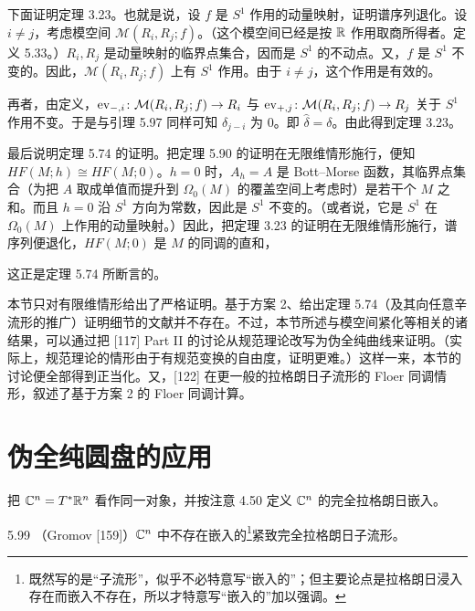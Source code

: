 下面证明定理 3.23。也就是说，设 $f$ 是 $S^1$ 作用的动量映射，证明谱序列退化。设 $i\neq j$，考虑模空间 $\mathcal{M}(R_i,R_j;f)$。（这个模空间已经是按 $\mathbb{R}$ 作用取商所得者。定义 5.33。）$R_i,R_j$ 是动量映射的临界点集合，因而是 $S^1$ 的不动点。又，$f$ 是 $S^1$ 不变的。因此，$\mathcal{M}(R_i,R_j;f)$ 上有 $S^1$ 作用。由于 $i\neq j$，这个作用是有效的。

再者，由定义，$\operatorname{ev}_{-,i}\colon\mathcal{M}(R_i,R_j;f)\to R_i$ 与 $\operatorname{ev}_{+,j}\colon\mathcal{M}(R_i,R_j;f)\to R_j$ 关于 $S^1$ 作用不变。于是与引理 5.97 同样可知 $\delta_{j-i}$ 为 0。即 $\hat\delta=\delta$。由此得到定理 3.23。

最后说明定理 5.74 的证明。把定理 5.90 的证明在无限维情形施行，便知 $HF(M;h)\cong HF(M;0)$。$h=0$ 时，$A_h=A$ 是 Bott–Morse 函数，其临界点集合（为把 $A$ 取成单值而提升到 $\Omega_0(M)$ 的覆盖空间上考虑时）是若干个 $M$ 之和。而且 $h=0$ 沿 $S^1$ 方向为常数，因此是 $S^1$ 不变的。（或者说，它是 $S^1$ 在 $\Omega_0(M)$ 上作用的动量映射。）因此，把定理 3.23 的证明在无限维情形施行，谱序列便退化，$HF(M;0)$ 是 $M$ 的同调的直和，

这正是定理 5.74 所断言的。

本节只对有限维情形给出了严格证明。基于方案 2、给出定理 5.74（及其向任意辛流形的推广）证明细节的文献并不存在。不过，本节所述与模空间紧化等相关的诸结果，可以通过把 [117] Part II 的讨论从规范理论改写为伪全纯曲线来证明。（实际上，规范理论的情形由于有规范变换的自由度，证明更难。）这样一来，本节的讨论便全部得到正当化。又，[122] 在更一般的拉格朗日子流形的 Floer 同调情形，叙述了基于方案 2 的 Floer 同调计算。

\section{伪全纯圆盘的应用}


把 $\mathbb{C}^n=T^*\mathbb{R}^n$ 看作同一对象，并按注意 4.50 定义 $\mathbb{C}^n$ 的完全拉格朗日嵌入。

\begin{theorem}{5.99}
  （Gromov [159]）$\mathbb{C}^n$ 中不存在嵌入的\footnote{既然写的是“子流形”，似乎不必特意写“嵌入的”；但主要论点是拉格朗日浸入存在而嵌入不存在，所以才特意写“嵌入的”加以强调。}紧致完全拉格朗日子流形。
\end{theorem}

